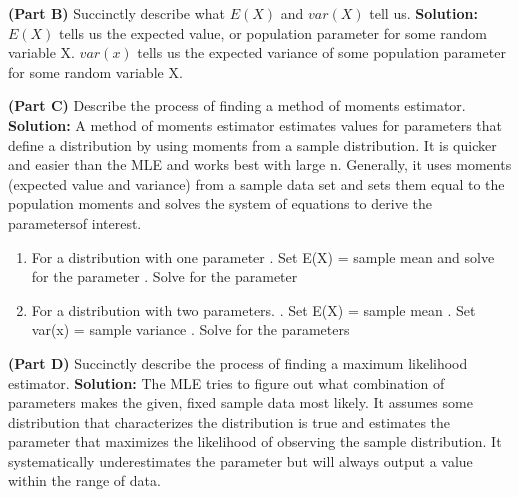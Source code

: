 \documentclass{article}
\begin{document}
\begin{enumerate}
\textbf{(Part B)} Succinctly describe what $E(X)$ and $var(X)$ tell us.
\newline
\newline
\textbf{Solution:}
$E(X)$ tells us the expected value, or population parameter for some random variable X. 
$var(x)$ tells us the expected variance of some population parameter for some random variable X. 
\newline

\textbf{(Part C)} Describe the process of finding a method of moments estimator.
\newline
\newline
\textbf{Solution:}
A method of moments estimator estimates values for parameters that define a distribution by using moments from a sample distribution. It is quicker and easier than the MLE and works best with large n. Generally, it uses moments (expected value and variance) from a sample data set and sets them equal to the population moments and solves the system of equations to derive the parametersof interest.
\begin{enumerate}
  \item For a distribution with one parameter
  . Set E(X) = sample mean and solve for the parameter
    . Solve for the parameter
  \item For a distribution with two parameters.
  . Set E(X) = sample mean
    . Set var(x) = sample variance
    . Solve for the parameters
\end{enumerate}

\textbf{(Part D)} Succinctly describe the process of finding a maximum likelihood estimator.
\newline
\newline
\textbf{Solution:}
The MLE tries to figure out what combination of parameters makes the given, fixed sample data most likely. It assumes some distribution that characterizes the distribution is true and estimates the parameter that maximizes the likelihood of observing the sample distribution. It systematically underestimates the parameter but will always output a value within the range of data. 
\newline


\end{enumerate}
\end{document}
